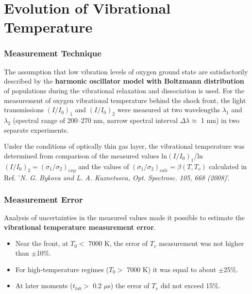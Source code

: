 \documentclass[10pt]{beamer}
\begin{document}
\section{Evolution of Vibrational Temperature}

\begin{frame}
\frametitle{Measurement Technique}
The assumption that low vibration levels of oxygen ground state are
satisfactorily described by the \textbf{harmonic oscillator model with Boltzmann
distribution} of populations during the vibrational relaxation and dissociation
is used. \newline\newline
For the measurement of oxygen vibrational temperature behind the shock front, the
light transmissions $\left(I/I_0\right)_1$ and $\left(I/I_0\right)_2$ were
measured at two wavelengths $\lambda_1$ and $\lambda_2$ (spectral range of
200–270 nm, narrow spectral interval $\Delta\lambda	\approx$ 1 nm) in two
separate experiments.

Under the conditions of optically thin gas layer, the vibrational temperature
was determined from comparison of the measured values
ln$\left(I/I_0\right)_1$/ln$\left(I/I_0\right)_2=\left(\sigma_1/\sigma_2\right)_
{exp}$ and the values of
$\left(\sigma_1/\sigma_2\right)_{calc}=\beta\left(T,T_v\right)$ calculated in
Ref. '\textit{N. G. Bykova and L. A. Kuznetsova, Opt. Spectrosc. 105, 668
(2008)}'.
\end{frame}

\begin{frame}
\frametitle{Measurement Error}
Analysis of uncertainties in the measured values made it possible to estimate the \textbf{vibrational temperature measurement error}.
\begin{itemize}
	\item Near the front, at $T_0<$ 7000 K, the error of $T_v$ measurement was not higher than $\pm$10\%.
	\item For high-temperature regimes ($T_0>$ 7000 K) it was equal to about
	$\pm$25\%.
	\item At later moments ($t_{lab}>$ 0.2 $\mu$s) the error of $T_v$ did not
	exceed 15\%.
\end{itemize}
\end{frame}
\end{document}
